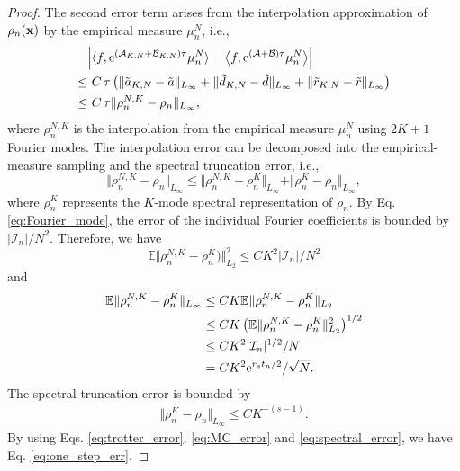 \documentclass[preprint,12pt]{elsarticle}
\theoremstyle{definition}
\theoremstyle{remark}
\begin{document}
\begin{proof}
The second error term arises from the interpolation approximation of $\rho_n(\mathbf x)$ by the empirical measure $\mu_n^N$, i.e., 
\begin{equation}
\begin{split}
&\Big|\langle f, {\rm e}^{(\mathcal{A}_{K,N} + \mathcal{B}_{K,N})\tau} \mu_{n}^N\rangle - \big\langle f, {\rm e}^{(\mathcal{A} + \mathcal{B})\tau} \mu_n^N\big\rangle\Big| \\
\le &\ C\,\tau\left(\Vert \tilde{a}_{K,N}-\tilde{a}\Vert_{L_\infty}+\Vert\tilde{d}_{K,N}-\tilde{d}\Vert_{L_\infty}+\Vert \tilde{r}_{K,N}-\tilde{r}\Vert_{L_\infty}\right) \\
\le & \ C\, \tau \Vert\rho_n^{N,K}-\rho_n\Vert_{L_\infty},
\end{split}    
\end{equation}
where $\rho_n^{N,K}$ is the interpolation from the empirical measure $\mu_n^N$ using $2K+1$ Fourier modes. 
%
The interpolation error can be decomposed into the empirical-measure sampling and the spectral truncation error, i.e., 
\[
\Vert\rho_n^{N,K}-\rho_n\Vert_{L_\infty} \le \Vert\rho_n^{N,K}-\rho_n^{K}\Vert_{L_\infty} + \Vert\rho_n^{K}-\rho_n\Vert_{L_\infty},
\]
where $\rho_n^{K}$ represents the $K$-mode spectral representation of $\rho_n$. By Eq. \eqref{eq:Fourier_mode}, the error of the individual Fourier coefficients is bounded by 
$\vert \mathcal{I}_{n}\vert/N^2$. 
Therefore, we have
\[
\mathbb{E}\Vert\rho^{N,K}_n - \rho^{K}_n)\Vert_{L_2}^2 \le C K^2 \vert \mathcal{I}_{n}\vert/N^2
\]
and
\begin{equation}
\begin{split}
\mathbb{E} \Vert\rho_n^{N,K}-\rho_n^K\Vert_{L_\infty} &\le 
CK \mathbb{E}\Vert\rho^{N,K}_n - \rho^{K}_n\Vert_{L_2} \\
&\le 
CK\left(\mathbb{E}\Vert\rho^{N,K}_n - \rho^{K}_n\Vert_{L_2}^2\right)^{1/2} \\
&\le CK^2 \vert \mathcal{I}_{n}\vert^{1/2}/N \\
&= C K^2 {\rm e}^{r_s t_n/2}/\sqrt{N}.
\end{split}
\label{eq:MC_error}
\end{equation}
The spectral truncation error is bounded by 
\begin{equation}
\begin{split}
\Vert\rho_n^{K}-\rho_n\Vert_{L_\infty} \le C K^{-(s-1)}.   
\end{split}
\label{eq:spectral_error}
\end{equation}
By using Eqs. \eqref{eq:trotter_error}, \eqref{eq:MC_error} and \eqref{eq:spectral_error}, we have Eq. \eqref{eq:one_step_err}. 
\end{proof}
\end{document}
